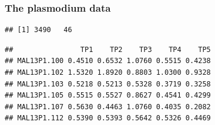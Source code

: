 

\begin{frame}[fragile]
\frametitle{The plasmodium data}

\begin{knitrout}\scriptsize
{}\color{fgcolor}\begin{kframe}
\begin{alltt}
\hlstd{(}\hlstd{)}
\end{alltt}
\begin{verbatim}
## [1] 3490   46
\end{verbatim}
\begin{alltt}
\hlstd{(Y)[,} \hlopt{:}\hlstd{]}
\end{alltt}
\begin{verbatim}
##                TP1    TP2    TP3    TP4    TP5
## MAL13P1.100 0.4510 0.6532 1.0760 0.5515 0.4238
## MAL13P1.102 1.5320 1.8920 0.8803 1.0300 0.9328
## MAL13P1.103 0.5218 0.5213 0.5328 0.3719 0.3258
## MAL13P1.105 0.5515 0.5527 0.8627 0.4541 0.4299
## MAL13P1.107 0.5630 0.4463 1.0760 0.4035 0.2082
## MAL13P1.112 0.5390 0.5393 0.5642 0.5326 0.4469
\end{verbatim}
\end{kframe}
\end{knitrout}
\end{frame}


